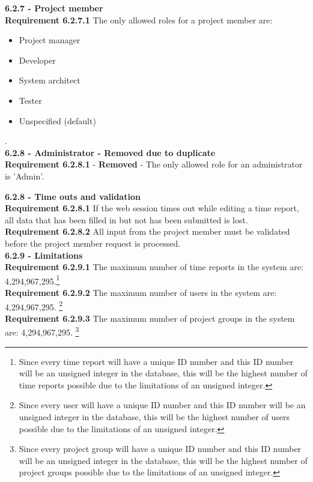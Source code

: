 \documentclass{article}
\begin{document}
{\fontsize{11}{11}\selectfont \noindent\textbf{6.2.7 - Project member}} \\
\textbf{Requirement 6.2.7.1} The only allowed roles for a project member are:
\begin{itemize}
\item Project manager
\item Developer
\item System architect
\item Tester
\item Unspecified (default)
\end{itemize}.\\

{\fontsize{11}{11}\selectfont \noindent\textbf{6.2.8 - Administrator - Removed due to duplicate}} \\
\textbf{Requirement 6.2.8.1} - \textbf{Removed} - The only allowed role for an administrator is 'Admin'.


{\fontsize{11}{11}\selectfont \noindent\textbf{6.2.8 - Time outs and validation}} \\
\textbf{Requirement 6.2.8.1} If the web session times out while editing a time report, all data that has been filled in but not has been submitted is lost.\\
\textbf{Requirement 6.2.8.2} All input from the project member must be validated before the project member request is processed.\\

{\fontsize{11}{11}\selectfont \noindent\textbf{6.2.9 - Limitations}} \\
\textbf{Requirement 6.2.9.1} The maximum number of time reports in the system are: 4,294,967,295.\footnote{Since every time report will have a unique ID number and this ID number will be an unsigned integer in the database, this will be the highest number of time reports possible due to the limitations of an unsigned integer.} \\
\textbf{Requirement 6.2.9.2} The maximum number of users in the system are: 4,294,967,295. \footnote{Since every user will have a unique ID number and this ID number will be an unsigned integer in the database, this will be the highest number of users possible due to the limitations of an unsigned integer.} \\
\textbf{Requirement 6.2.9.3} The maximum number of project groups in the system are: 4,294,967,295. \footnote{Since every project group will have a unique ID number and this ID number will be an unsigned integer in the database, this will be the highest number of project groups possible due to the limitations of an unsigned integer.}\\
\end{document}
